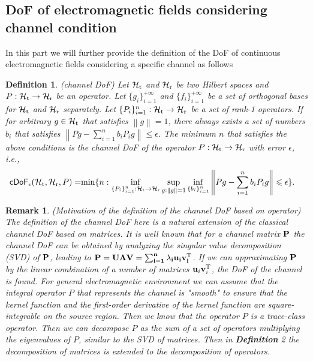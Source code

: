 \documentclass[12pt,draftclsnofoot,journal,onecolumn]{IEEEtran}
\newtheorem{definition}{Definition}
\newtheorem{remark}{Remark}
\begin{document}
	{\color{red}
\subsection{DoF of electromagnetic fields considering channel condition}

In this part we will further provide the definition of the DoF of continuous electromagnetic fields considering a specific channel as follows
	}
\begin{definition}
	\label{def_cDoF}
		(channel DoF) Let $\mathcal{H}_{\rm t}$ and $\mathcal{H}_{\rm r}$ be two Hilbert spaces and $P:\mathcal{H}_{\rm t} \rightarrow \mathcal{H}_{\rm r}$ be an operator. Let $\{g_i\}_{i=1}^{+\infty}$ and $\{f_i\}_{i=1}^{+\infty}$ be a set of orthogonal bases for $\mathcal{H}_{\rm t}$ and $\mathcal{H}_{\rm r}$ separately. Let $\{P_i\}_{i=1}^n: \mathcal{H}_{\rm t} \rightarrow \mathcal{H}_{\rm r}$ be a set of rank-1 operators. 
		If for arbitrary $g \in \mathcal{H}_{\rm t}$ that satisfies $\left\| g \right\|=1$, there always exists a set of numbers $b_i$ that satisfies $\left\| Pg-\sum_{i=1}^{n} b_iP_ig  \right\| \leqslant \epsilon$. The minimum $n$ that satisfies the above conditions is the channel DoF of the operator $P: \mathcal{H}_{\rm t} \rightarrow \mathcal{H}_{\rm r}$ with error $\epsilon$, i.e., 
		\begin{equation}
			\begin{aligned}
			\mathsf{cDoF}_{\epsilon} (\mathcal{H}_{\rm t},\mathcal{H}_{\rm r},P) =& {\rm min}\{ n: \underset{\{P_i\}_{i=1}^n: \mathcal{H}_{\rm t} \rightarrow \mathcal{H}_{\rm r}}{\rm inf} \sup_{g: \left\| g \right\|=1} \inf_{\{b_i\}_{i=1}^n} \left\| Pg-\sum_{i=1}^{n} b_iP_ig  \right\| \leqslant \epsilon  \}.
			\end{aligned}
		\end{equation}
	\end{definition}
	
	\begin{remark}
		(Motivation of the definition of the channel DoF based on operator)
		The definition of the channel DoF here is a natural extension of the classical channel DoF based on matrices. It is well known that for a channel matrix $\bf{P}$ the channel DoF can be obtained by analyzing the singular value decomposition (SVD) of $\bf{P}$, leading to ${\bf P} = {\bf U}\boldsymbol{\Lambda}\bf{V} = \sum_{i=1}^n \lambda_i {\bf u}_i{\bf v}_i^{\rm T}$. 
		If we can approximating ${\bf P}$ by the linear combination of a number of matrices ${\bf u}_i{\bf v}_i^{\rm T}$, the DoF of the channel is found. For general electromagnetic environment we can assume that the integral operator $P$ that represents the channel is "smooth" to ensure that the kernel function and the first-order derivative of the kernel function are square-integrable on the source region. Then we know that the operator $P$ is a trace-class operator\cite{bornemann2010numerical}. Then we can decompose $P$ as the sum of a set of operators multiplying the eigenvalues of $P$, similar to the SVD of matrices. Then in {\bf Definition} 2 the decomposition of matrices is extended to the decomposition of operators.
	\end{remark}
	
\end{document}
